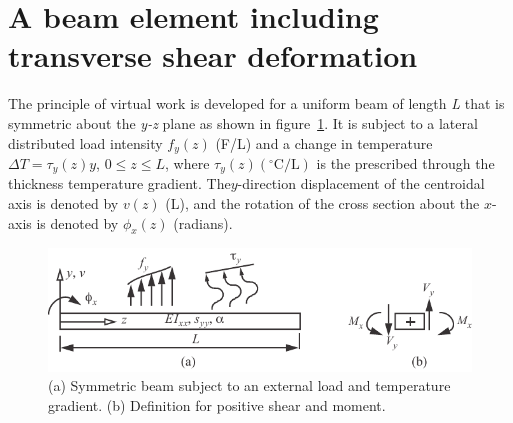 \documentclass{AeroStructure-ERJohnson}
\begin{document}
{\def\thefigure{17.12}
}

\pagebreak

\section{A beam element including transverse shear deformation}\label{sec17.3}

The principle of virtual work is developed for a uniform beam of length \textit{L} that is symmetric about the \textit{y-z} plane as shown in figure~\ref{fig17.13}. It is subject to a lateral distributed load intensity $f_{y}(z)$ (F/L) and a change in temperature $\Delta T=\tau_{y}(z)y$, $0\leq z\leq L$, where $\tau_{y}(z) \left({ }^{\circ} \mathrm{C}/ \mathrm{L}\right)$ is the prescribed through the thickness temperature gradient. The\break $y$-direction displacement of the centroidal axis is denoted by $v(z)$ (L), and the rotation of the cross section about the $x$-axis is denoted by $\phi_{x}(z)$ (radians).

{\def\thefigure{17.13}
\begin{figure}[!h]
\centerline{\includegraphics{Figure_17-13.pdf}}
\caption{(a) Symmetric beam subject to an external load and temperature gradient. (b) Definition for positive shear and moment.} \label{fig17.13}
\end{figure}}
\end{document}
